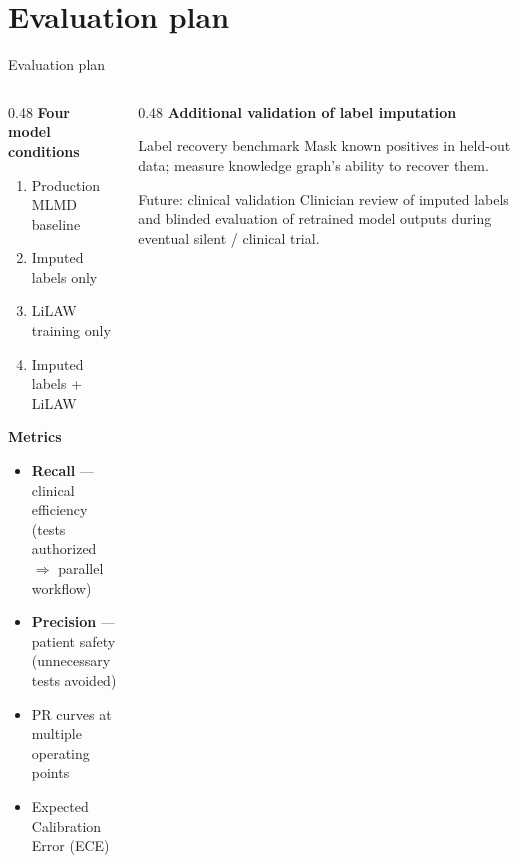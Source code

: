 \documentclass[aspectratio=169]{beamer}
\begin{document}
\section{Evaluation plan}

\begin{frame}{Evaluation plan}
  \begin{columns}[T]
    \begin{column}{0.48\textwidth}
      \textbf{Four model conditions}
      \begin{enumerate}
        \item Production MLMD baseline
        \item Imputed labels only
        \item LiLAW training only
        \item Imputed labels + LiLAW
      \end{enumerate}

      \vspace{0.6em}
      \textbf{Metrics}
      \begin{itemize}
        \item \textbf{Recall} --- clinical efficiency\\
              {\small (tests authorized $\Rightarrow$ parallel workflow)}
        \item \textbf{Precision} --- patient safety\\
              {\small (unnecessary tests avoided)}
        \item PR curves at multiple operating points
        \item Expected Calibration Error (ECE)
      \end{itemize}
    \end{column}
    \begin{column}{0.48\textwidth}
      \textbf{Additional validation of label imputation}

      \vspace{0.3em}
      \begin{block}{Label recovery benchmark}
        \small
        Mask known positives in held-out data;
        measure knowledge graph's
        ability to recover them.
      \end{block}

      \vspace{0.3em}
      \begin{block}{Future: clinical validation}
        \small
        Clinician review of imputed labels and
        blinded evaluation of retrained model outputs
        during eventual silent / clinical trial.
      \end{block}
    \end{column}
  \end{columns}
\end{frame}
\end{document}
